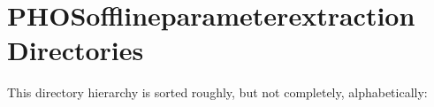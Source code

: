 \section{PHOSofflineparameterextraction Directories}
This directory hierarchy is sorted roughly, but not completely, alphabetically:\begin{CompactList}
\item {}
\end{CompactList}
